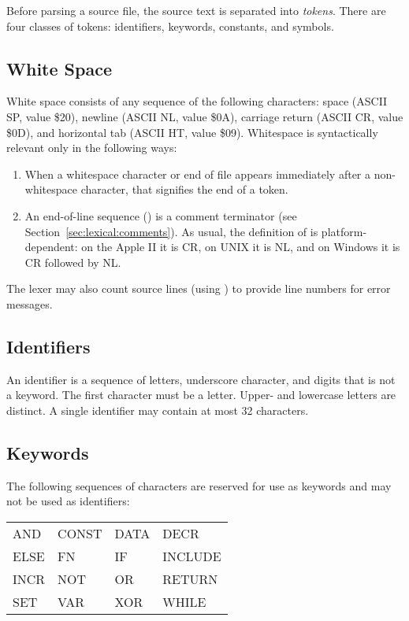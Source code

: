 \documentclass[10pt]{article}
\begin{document}
Before parsing a source file, the source text is separated into
\emph{tokens}.  There are four classes of tokens: identifiers,
keywords, constants, and symbols.

\subsection{White Space}
\label{sec:lexical:white-space}

White space consists of any sequence of the following characters:
space (ASCII SP, value \$20), newline (ASCII NL, value \$0A), carriage
return (ASCII CR, value \$0D), and horizontal tab (ASCII HT, value
\$09).  Whitespace is syntactically relevant only in the following
ways:
%
\begin{enumerate}
%
\item {} When a whitespace character or end
  of file appears immediately after a non-whitespace character, that
  signifies the end of a token.
%
\item {} An end-of-line sequence () is a
  comment terminator (see Section~\ref{sec:lexical:comments}).  As
  usual, the definition of  is platform-dependent: on the
  Apple II it is CR, on UNIX it is NL, and on Windows it is CR
  followed by NL.
%
\end{enumerate}
%
The lexer may also count source lines (using ) to provide
line numbers for error messages.

\subsection{Identifiers}\label{Identifiers}

An identifier is a sequence of letters, underscore character, and
digits that is not a keyword.  The first character must be a letter.
Upper- and lowercase letters are distinct.  A single identifier may
contain at most 32 characters.

\subsection{Keywords}

The following sequences of characters are reserved for use as keywords
and may not be used as identifiers:

\begin{ttfamily}
\begin{center}
\begin{tabular}{l l l l}
AND & CONST & DATA & DECR \\
%
ELSE & FN & IF & INCLUDE \\
%
INCR & NOT & OR & RETURN \\
%
SET & VAR & XOR & WHILE \\
\end{tabular}
\end{center}
\end{ttfamily}
\end{document}
